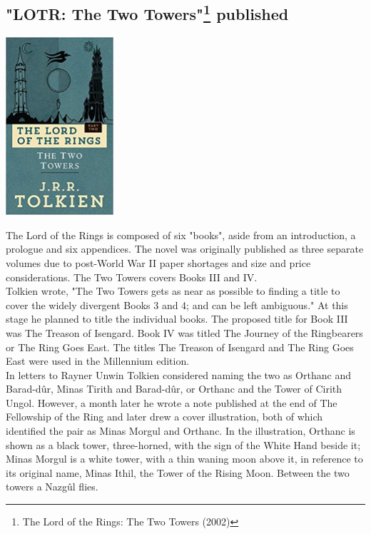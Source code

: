 \documentclass[11pt]{report}
\begin{document}
\subsection{"LOTR: The Two Towers"\protect\footnote{The Lord of the Rings: The Two Towers (2002)} published}
\vspace{2mm}\begin{center}\includegraphics[width=4cm]{./img/lotrbook2.jpg}\end{center}
The Lord of the Rings is composed of six "books", aside from an introduction, a prologue and six appendices. The novel was originally published as three separate volumes due to post-World War II paper shortages and size and price considerations. The Two Towers covers Books III and IV.\\
\indent Tolkien wrote, "The Two Towers gets as near as possible to finding a title to cover the widely divergent Books 3 and 4; and can be left ambiguous." At this stage he planned to title the individual books. The proposed title for Book III was The Treason of Isengard. Book IV was titled The Journey of the Ringbearers or The Ring Goes East. The titles The Treason of Isengard and The Ring Goes East were used in the Millennium edition.\\
\indent In letters to Rayner Unwin Tolkien considered naming the two as Orthanc and Barad-dûr, Minas Tirith and Barad-dûr, or Orthanc and the Tower of Cirith Ungol. However, a month later he wrote a note published at the end of The Fellowship of the Ring and later drew a cover illustration, both of which identified the pair as Minas Morgul and Orthanc. In the illustration, Orthanc is shown as a black tower, three-horned, with the sign of the White Hand beside it; Minas Morgul is a white tower, with a thin waning moon above it, in reference to its original name, Minas Ithil, the Tower of the Rising Moon. Between the two towers a Nazgûl flies.
\end{document}
